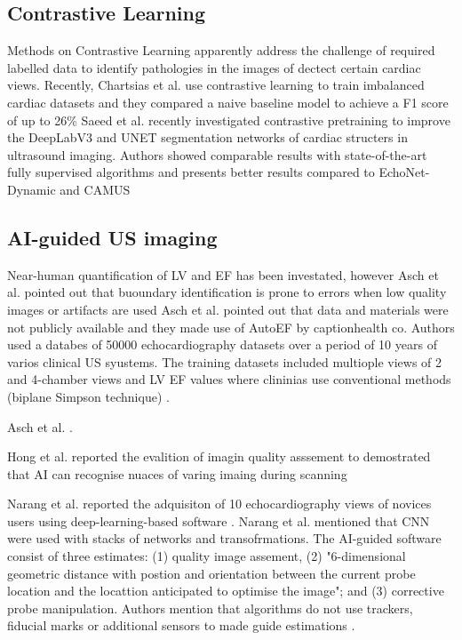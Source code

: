 \subsection{Contrastive Learning}
Methods on Contrastive Learning apparently address the challenge of required labelled data to identify pathologies in the images of dectect certain cardiac views.
Recently, Chartsias et al. use contrastive learning to train imbalanced cardiac datasets and they compared a naive baseline model to achieve a F1 score of up to 26\% \cite{chartsias2021-ASMUS}
Saeed et al. recently investigated contrastive pretraining to improve the DeepLabV3 and UNET segmentation networks of cardiac structers in ultrasound imaging.
Authors showed comparable results with state-of-the-art fully supervised algorithms and presents better results compared to EchoNet-Dynamic and CAMUS \cite{saeed2021MIDL}





\subsection{AI-guided US imaging}

Near-human quantification of LV and EF has been investated, however Asch et al. pointed out that buoundary identification is prone to errors when low quality images or artifacts are used
Asch et al. pointed out that data and materials were not publicly available and they made use of AutoEF by captionhealth co.
Authors used a databes of 50000 echocardiography datasets over a period of 10 years of varios clinical US syustems. 
The training datasets included multiople views of 2 and 4-chamber views and LV EF values where clininias use conventional methods (biplane Simpson technique) \cite{asch2019CIRIMAGING}.

Asch et al. \cite{asch2021CircImaging}.

Hong et al. reported the evalition of imagin quality asssement to demostrated that AI can recognise nuaces of varing imaing during scanning \cite{hong2021JACC}


Narang et al. reported the adquisiton of 10 echocardiography views of novices users using deep-learning-based software \cite{Narang2021JAMACARDIOLOGY}.
Narang et al. mentioned that CNN were used with stacks of networks and transofrmations. 
The AI-guided software consist of three estimates: (1) quality image assement, (2) "6-dimensional geometric distance with postion and orientation between the current probe location and the locattion anticipated to optimise the image"; and (3) corrective probe manipulation. \cite{Narang2021JAMACARDIOLOGY}
Authors mention that algorithms do not use trackers, fiducial marks or additional sensors to made guide estimations \cite{Narang2021JAMACARDIOLOGY}.



